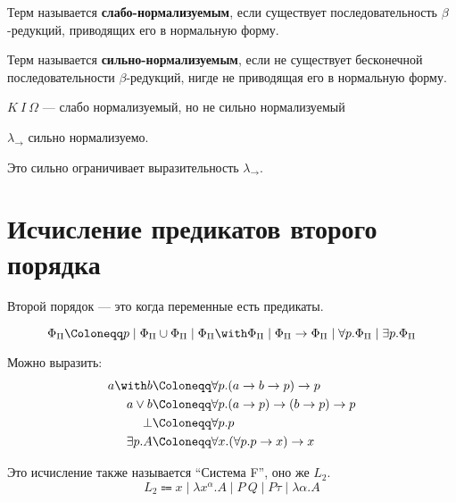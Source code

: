 \begin{definition}
    Терм называется \textbf{слабо-нормализуемым}, если существует последовательность \(\beta\)-редукций, приводящих его в нормальную форму.
\end{definition}

\begin{definition}
    Терм называется \textbf{сильно-нормализуемым}, если не существует бесконечной последовательности \(\beta\)-редукций, нигде не приводящая его в нормальную форму.
\end{definition}

\begin{example}
    \(K\ I\ \Omega\) --- слабо нормализуемый, но не сильно нормализуемый
\end{example}

\begin{theorem}
    \(\lambda_{ \to }\) сильно нормализуемо.
\end{theorem}

\begin{remark}
    Это сильно ограничивает выразительность \(\lambda_{ \to }\).
\end{remark}

\section{Исчисление предикатов второго порядка}

Второй порядок --- это когда переменные есть предикаты.

\begin{definition}[предикат]
    \[\Phi_\Pi \Coloneqq p \mid \Phi_\Pi \cup \Phi_\Pi \mid \Phi_\Pi \with \Phi_\Pi \mid \Phi_\Pi \to \Phi_\Pi \mid \forall p.\Phi_\Pi \mid \exists p.\Phi_\Pi\]
\end{definition}

\begin{statement}
    Можно выразить:
    \begin{align*}
        a \with b   & \Coloneqq \forall p.(a \to b \to p) \to p         \\
        a \lor b    & \Coloneqq \forall p.(a \to p) \to (b \to p) \to p \\
        \bot        & \Coloneqq \forall p.p                             \\
        \exists p.A & \Coloneqq \forall x.(\forall p.p \to x) \to x
    \end{align*}
\end{statement}

Это исчисление также называется ``Система F'', оно же \(L_2\).
\[L_2 \Coloneqq x \mid \lambda x^\alpha.A \mid P\ Q \mid P \tau \mid \lambda \alpha.A\]
